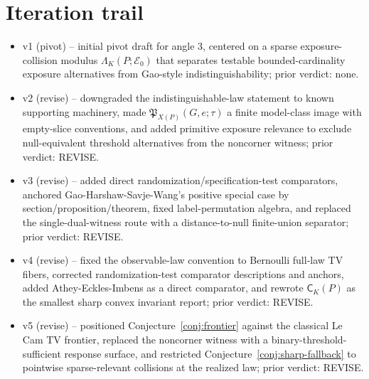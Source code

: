 \documentclass[11pt]{article}
\theoremstyle{definition}
\theoremstyle{plain}
\theoremstyle{remark}
\begin{document}
\section{Iteration trail}
\begin{itemize}[leftmargin=*]
\item v1 (pivot) -- initial pivot draft for angle 3, centered on a sparse exposure-collision modulus \(\Lambda_K(P;\mathcal E_0)\) that separates testable bounded-cardinality exposure alternatives from Gao-style indistinguishability; prior verdict: none.
\item v2 (revise) -- downgraded the indistinguishable-law statement to known supporting machinery, made \(\mathfrak P_{X(P)}(G,e;\tau)\) a finite model-class image with empty-slice conventions, and added primitive exposure relevance to exclude null-equivalent threshold alternatives from the noncorner witness; prior verdict: REVISE.
\item v3 (revise) -- added direct randomization/specification-test comparators, anchored Gao-Harshaw-Savje-Wang's positive special case by section/proposition/theorem, fixed label-permutation algebra, and replaced the single-dual-witness route with a distance-to-null finite-union separator; prior verdict: REVISE.
\item v4 (revise) -- fixed the observable-law convention to Bernoulli full-law TV fibers, corrected randomization-test comparator descriptions and anchors, added Athey-Eckles-Imbens as a direct comparator, and rewrote \(\mathsf C_K(P)\) as the smallest sharp convex invariant report; prior verdict: REVISE.
\item v5 (revise) -- positioned Conjecture~\ref{conj:frontier} against the classical Le Cam TV frontier, replaced the noncorner witness with a binary-threshold-sufficient response surface, and restricted Conjecture~\ref{conj:sharp-fallback} to pointwise sparse-relevant collisions at the realized law; prior verdict: REVISE.
\end{itemize}
\end{document}

